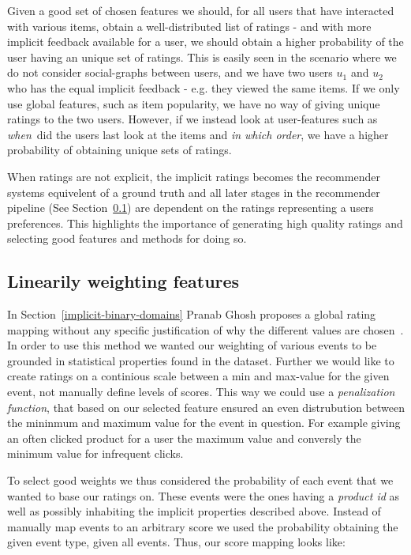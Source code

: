 Given a good set of chosen features we should, for all users that have
interacted with various items, obtain a well-distributed list of ratings - and
with more implicit feedback available for a user, we should obtain a higher
probability of the user having an unique set of ratings. This is easily seen in
the scenario where we do not consider social-graphs between users, and we have
two users $u_1$ and $u_2$ who has the equal implicit feedback - e.g. they
viewed the same items. If we only use global features, such as item popularity,
we have no way of giving unique ratings to the two users. However, if we
instead look at user-features such as \textit{when} did the users last look at
the items and \textit{in which order}, we have a higher probability of
obtaining unique sets of ratings.

When ratings are not explicit, the implicit ratings becomes the recommender
systems equivelent of a ground truth and all later stages in the recommender
pipeline (See Section~\ref{}) are dependent on the ratings representing a users
preferences. This highlights the importance of generating high quality ratings
and selecting good features and methods for doing so.

\subsection{Linearily weighting features}

In Section~\ref{implicit-binary-domains} Pranab Ghosh proposes a global rating
mapping without any specific justification of why the different values are
chosen~\cite{pkghost2014implicit}. In order to use this method we wanted our
weighting of various events to be grounded in statistical properties found in
the dataset. Further we would like to create ratings on a continious scale
between a min and max-value for the given event, not manually define levels of
scores. This way we could use a \textit{penalization function}, that based on
our selected feature ensured an even distrubution between the mininmum and
maximum value for the event in question. For example giving an often clicked
product for a user the maximum value and conversly the minimum value for
infrequent clicks.

To select good weights we thus considered the probability of each event that we
wanted to base our ratings on. These events were the ones having a
\textit{product id} as well as possibly inhabiting the implicit properties
described above. Instead of manually map events to an arbitrary score we used
the probability obtaining the given event type, given all events. Thus, our
score mapping looks like:

